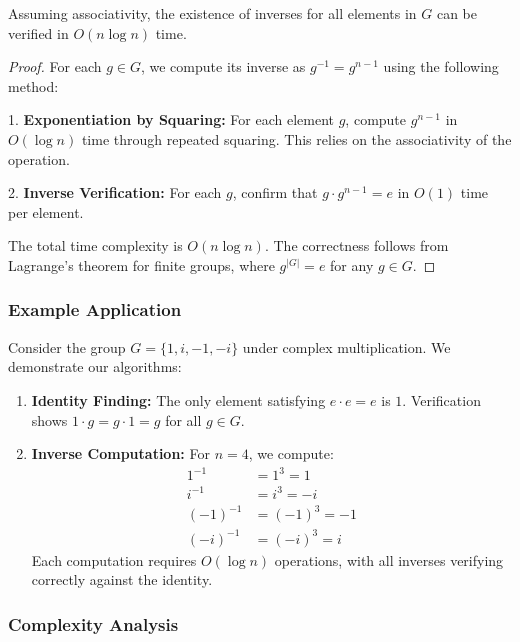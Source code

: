 \documentclass[sigconf]{acmart}
\begin{document}
\begin{theorem}
Assuming associativity, the existence of inverses for all elements in $G$ can be verified in $O(n\log n)$ time.
\end{theorem}

\begin{proof}
For each $g \in G$, we compute its inverse as $g^{-1} = g^{n-1}$ using the following method:

1. \textbf{Exponentiation by Squaring:} For each element $g$, compute $g^{n-1}$ in $O(\log n)$ time through repeated squaring. This relies on the associativity of the operation.

2. \textbf{Inverse Verification:} For each $g$, confirm that $g \cdot g^{n-1} = e$ in $O(1)$ time per element.

The total time complexity is $O(n\log n)$. The correctness follows from Lagrange's theorem for finite groups, where $g^{|G|} = e$ for any $g \in G$.
\end{proof}

\subsubsection{Example Application}
\label{subsec:example}

Consider the group $G = \{1, i, -1, -i\}$ under complex multiplication. We demonstrate our algorithms:

\begin{enumerate}
    \item \textbf{Identity Finding:} The only element satisfying $e \cdot e = e$ is $1$. Verification shows $1 \cdot g = g \cdot 1 = g$ for all $g \in G$.

    \item \textbf{Inverse Computation:} For $n=4$, we compute:
    \begin{align*}
        1^{-1} &= 1^3 = 1 \\
        i^{-1} &= i^3 = -i \\
        (-1)^{-1} &= (-1)^3 = -1 \\
        (-i)^{-1} &= (-i)^3 = i
    \end{align*}
    Each computation requires $O(\log n)$ operations, with all inverses verifying correctly against the identity.
\end{enumerate}

\subsubsection{Complexity Analysis}
\end{document}
